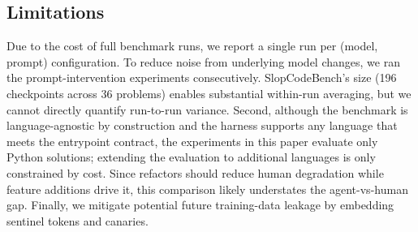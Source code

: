 \subsection{Limitations}
\label{sec:limitations}

Due to the cost of full benchmark runs, we report a single run per (model, prompt) configuration. To reduce noise from underlying model changes, we ran the prompt-intervention experiments consecutively. SlopCodeBench's size (196 checkpoints across 36 problems) enables substantial within-run averaging, but we cannot directly quantify run-to-run variance. Second, although the benchmark is language-agnostic by construction and the harness supports any language that meets the entrypoint contract, the experiments in this paper evaluate only Python solutions; extending the evaluation to additional languages is only constrained by cost. Since refactors should reduce human degradation while feature additions drive it, this comparison likely understates the agent-vs-human gap. Finally, we mitigate potential future training-data leakage by embedding sentinel tokens and canaries.
